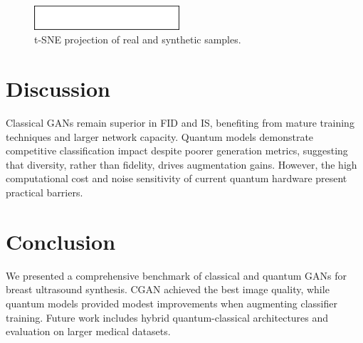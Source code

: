 \documentclass[pdflatex,sn-mathphys-num]{sn-jnl}
\theoremstyle{thmstyleone}
\theoremstyle{thmstyletwo}
\theoremstyle{thmstylethree}
\begin{document}
\begin{figure}[ht]
\centering
\includegraphics[width=0.48\textwidth]{fig.eps}
\caption{t-SNE projection of real and synthetic samples.}
\label{fig:tsne}
\end{figure}

\section{Discussion}\label{sec:discussion}
Classical GANs remain superior in FID and IS, benefiting from mature training techniques and larger network capacity. Quantum models demonstrate competitive classification impact despite poorer generation metrics, suggesting that diversity, rather than fidelity, drives augmentation gains. However, the high computational cost and noise sensitivity of current quantum hardware present practical barriers.

\section{Conclusion}\label{sec:conclusion}
We presented a comprehensive benchmark of classical and quantum GANs for breast ultrasound synthesis. CGAN achieved the best image quality, while quantum models provided modest improvements when augmenting classifier training. Future work includes hybrid quantum-classical architectures and evaluation on larger medical datasets.


\end{document}
